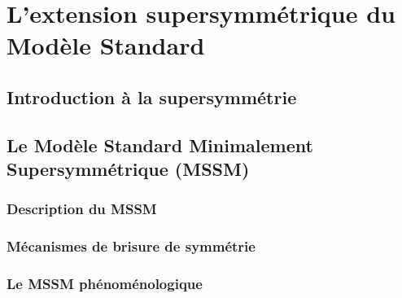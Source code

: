 \singlespacing{}
\section{L'extension supersymmétrique du Modèle Standard}
\label{sec:susy}
\doublespacing{}

\subsection{Introduction à la supersymmétrie}
\label{sec:susy:th}

\subsection{Le Modèle Standard Minimalement Supersymmétrique (MSSM)}
\label{sec:susy:mssm}

\subsubsection{Description du MSSM}
\label{sec:susy:mssm:descr}

\subsubsection{Mécanismes de brisure de symmétrie}
\label{sec:susy:mssm:break}

\subsubsection{Le MSSM phénoménologique}
\label{sec:susy:mssm:pmssm}


